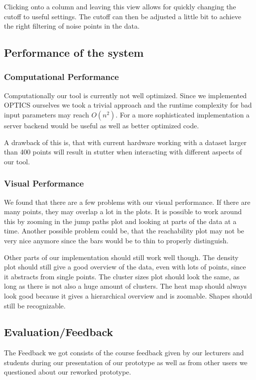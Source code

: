 \documentclass{vgtc} %
\begin{document}
Clicking onto a column and leaving this view allows for quickly changing the cutoff to useful settings. The cutoff can then be adjusted a little bit to achieve the right filtering of noise points in the data.

\subsection{Performance of the system}
\subsubsection{Computational Performance}

Computationally our tool is currently not well optimized. Since we implemented OPTICS ourselves we took a trivial approach and the runtime complexity for bad input parameters may reach $ O(n^{2}) $. For a more sophisticated implementation a server backend would be useful as well as better optimized code.

A drawback of this is, that with current hardware working with a dataset larger than 400 points will result in stutter when interacting with different aspects of our tool.

\subsubsection{Visual Performance}
We found that there are a few problems with our visual performance. If there are many points, they may overlap a lot in the plots. It is possible to work around this by zooming in the jump paths plot and looking at parts of the data at a time. Another possible problem could be, that the reachability plot may not be very nice anymore since the bars would be to thin to properly distinguish.

Other parts of our implementation should still work well though. The density plot should still give a good overview of the data, even with lots of points, since it abstracts from single points. The cluster sizes plot should look the same, as long as there is not also a huge amount of clusters. The heat map should always look good because it gives a hierarchical overview and is zoomable. Shapes should still be recognizable.
\subsection{Evaluation/Feedback}
The Feedback we got consists of the course feedback given by our lecturers and students during our presentation of our prototype as well as from other users we questioned about our reworked prototype.
\end{document}
